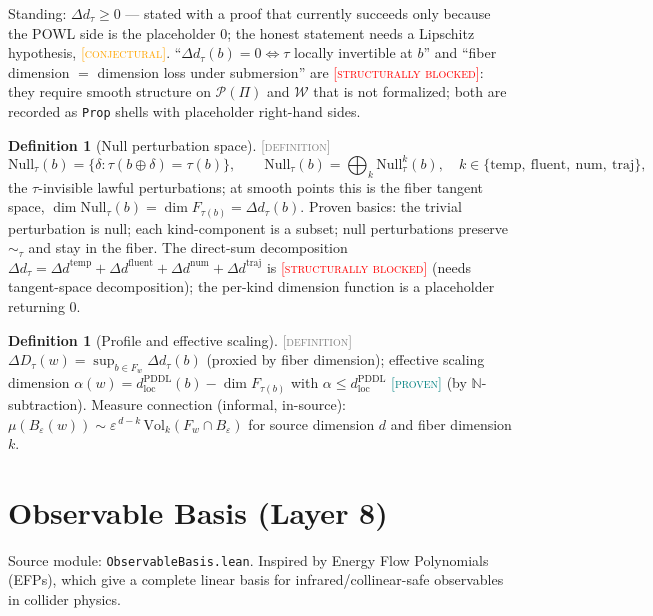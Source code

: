 \documentclass[11pt]{article}
\newcommand{\PROVEN}{\textcolor{teal}{\textsc{[proven]}}}
\newcommand{\DEFINITION}{\textcolor{gray}{\textsc{[definition]}}}
\newcommand{\CONJECTURAL}{\textcolor{orange}{\textsc{[conjectural]}}}
\newcommand{\BLOCKED}{\textcolor{red}{\textsc{[structurally blocked]}}}
\newcommand{\PT}{\Pi}                          %
\newcommand{\PS}{\mathcal{P}(\PT)}             %
\newcommand{\WS}{\mathcal{W}}                  %
\newcommand{\tmap}{\tau}                       %
\newcommand{\fib}[1]{F_{#1}}                   %
\newcommand{\N}{\mathbb{N}}
\theoremstyle{plain}
\theoremstyle{definition}
\newtheorem{definition}[theorem]{Definition}
\begin{document}
Standing:
$\Delta d_\tmap \ge 0$ --- stated with a proof that currently succeeds only
because the POWL side is the placeholder $0$; the honest statement needs a
Lipschitz hypothesis, \CONJECTURAL.
``$\Delta d_\tmap(b) = 0 \iff \tmap$ locally invertible at $b$'' and
``fiber dimension $=$ dimension loss under submersion'' are
\BLOCKED{}: they require smooth structure on $\PS$ and $\WS$ that is not
formalized; both are recorded as \texttt{Prop} shells with placeholder
right-hand sides.

\begin{definition}[Null perturbation space]\DEFINITION\;
\[
  \mathrm{Null}_\tmap(b) = \{\delta : \tmap(b \oplus \delta) = \tmap(b)\},
  \qquad
  \mathrm{Null}_\tmap(b)
  = \bigoplus_{k} \mathrm{Null}^{k}_\tmap(b),
  \quad k \in \{\text{temp},\ \text{fluent},\ \text{num},\ \text{traj}\},
\]
the $\tmap$-invisible lawful perturbations; at smooth points this is the
fiber tangent space, $\dim \mathrm{Null}_\tmap(b) = \dim \fib{\tmap(b)}
= \Delta d_\tmap(b)$. Proven basics: the trivial perturbation is null; each
kind-component is a subset; null perturbations preserve $\sim_\tmap$ and stay
in the fiber. The direct-sum decomposition
$\Delta d_\tmap = \Delta d^{\mathrm{temp}} + \Delta d^{\mathrm{fluent}} +
\Delta d^{\mathrm{num}} + \Delta d^{\mathrm{traj}}$ is \BLOCKED{} (needs
tangent-space decomposition); the per-kind dimension function is a
placeholder returning $0$.
\end{definition}

\begin{definition}[Profile and effective scaling]\DEFINITION\;
$\Delta D_\tmap(w) = \sup_{b \in \fib{w}} \Delta d_\tmap(b)$ (proxied by
fiber dimension); effective scaling dimension
$\alpha(w) = d^{\mathrm{PDDL}}_{\mathrm{loc}}(b) - \dim\fib{\tmap(b)}$
with $\alpha \le d^{\mathrm{PDDL}}_{\mathrm{loc}}$ \PROVEN{} (by
$\N$-subtraction). Measure connection (informal, in-source):
$\mu(B_\varepsilon(w)) \sim \varepsilon^{\,d-k}\,
\mathrm{Vol}_k(\fib{w} \cap B_\varepsilon)$ for source dimension $d$ and
fiber dimension $k$.
\end{definition}

\section{Observable Basis (Layer 8)}
\label{sec:basis}
Source module: \texttt{ObservableBasis.lean}. Inspired by Energy Flow
Polynomials (EFPs), which give a complete linear basis for
infrared/collinear-safe observables in collider physics.
\end{document}
